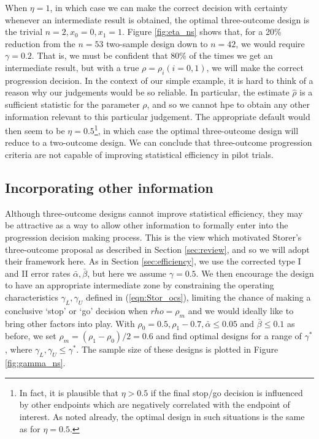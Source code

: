 \documentclass[sagev]{sagej} %
\begin{document}
When $\eta = 1$, in which case we can make the correct decision with certainty whenever an intermediate result is obtained, the optimal three-outcome design is the trivial $n = 2, x_0 = 0, x_1 = 1$. Figure \ref{fig:eta_ns} shows that, for a 20\% reduction from the $n = 53$ two-sample design down to $n = 42$, we would require $\gamma = 0.2$. That is, we must be confident that 80\% of the times we get an intermediate result, but with a true $\rho = \rho_i (i = 0,1)$, we will make the correct progression decision. In the context of our simple example, it is hard to think of a reason why our judgements would be so reliable. In particular, the estimate $\hat{\rho}$ is a sufficient statistic for the parameter $\rho$, and so we cannot hpe to obtain any other information relevant to this particular judgement. The appropriate default would then seem to be $\eta = 0.5$\footnote{In fact, it is plausible that $\eta > 0.5$ if the final stop/go decision is influenced by other endpoints which are negatively correlated with the endpoint of interest. As noted already, the optimal design in such situations is the same as for $\eta = 0.5$.}, in which case the optimal three-outcome design will reduce to a two-outcome design. We can conclude that three-outcome progression criteria are not capable of improving statistical efficiency in pilot trials.

\subsection{Incorporating other information}\label{sec:information}

Although three-outcome designs cannot improve statistical efficiency, they may be attractive as a way to allow other information to formally enter into the progression decision making process. This is the view which motivated Storer's three-outcome proposal \cite{Storer1992} as described in Section \ref{sec:review}, and so we will adopt their framework here. As in Section \ref{sec:efficiency}, we use the corrected type I and II error rates $\bar{\alpha}, \bar{\beta}$, but here we assume $\gamma = 0.5$. We then encourage the design to have an appropriate intermediate zone by constraining the operating characteristics $\gamma_L, \gamma_U$ defined in (\ref{eqn:Stor_ocs}), limiting the chance of making a conclusive `stop' or `go' decision when $rho = \rho_m$ and we would ideally like to bring other factors into play. With $\rho_0 = 0.5, \rho_1 - 0.7, \bar{\alpha} \leq 0.05$ and $\bar{\beta} \leq 0.1$ as before, we set $\rho_m = (\rho_1 - \rho_0)/2 = 0.6$ and find optimal designs for a range of $\gamma^*$, where $\gamma_L, \gamma_U \leq \gamma^*$. The sample size of these designs is plotted in Figure \ref{fig:gamma_ns}.
\end{document}
